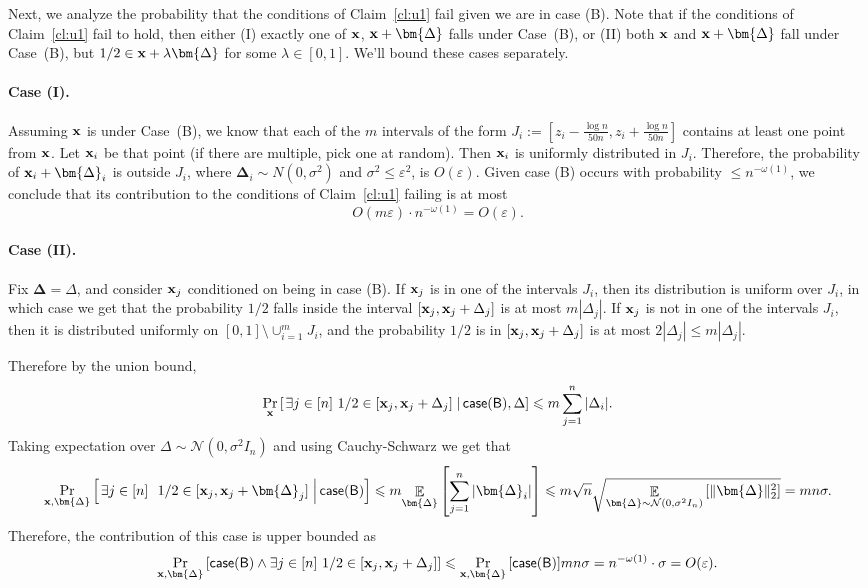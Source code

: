 \documentclass[10pt,a4paper]{article}
\newcommand\card[1]{\left| {#1} \right|}
\newcommand\Prob[2]{{\Pr_{#1}\left[ {#2} \right]}}
\newcommand\cProb[3]{{\Pr_{#1}\left[ \left. #3 \;\right\vert #2 \right]}}
\newcommand\Expect[2]{{\mathop{\mathbb{E}}_{#1}\left[ {#2} \right]}}
\newcommand\norm[1]{\| #1 \|}
\newcommand\eps{\varepsilon}
\renewcommand\leq{\leqslant}
\newcommand{\la}{\lambda}
\newcommand{\De}{\Delta}
\begin{document}
Next, we analyze the probability that the conditions of Claim~\ref{cl:u1} fail given we are in case (B).
Note that if the conditions of Claim~\ref{cl:u1} fail to hold, then either (I) exactly one of ${\bf x}$, ${\bf x}+\bm{\De}$ falls under Case~(B),
or (II) both ${\bf x}$ and ${\bf x}+\bm{\De}$ fall under Case~(B),  but $1/2\in {\bf x}+\la \bm{\De}$ for some $\la\in [0,1]$. We'll bound these cases separately.



\paragraph{Case (I).} Assuming ${\bf x}$ is under Case~(B), we know that each
of the $m$ intervals of the form $J_i := [z_i-\frac{\log n}{50n},z_i+\frac{\log n}{50n}]$ contains at least one point from ${\bf x}$.
Let ${\bf x}_i$ be that point (if there are multiple, pick one at random). Then ${\bf x}_i$ is uniformly distributed in $J_i$.
Therefore, the probability of ${\bf x}_i+\bm{\De}_i$ is outside $J_i$, where
$\bm{\De}_i \sim N(0,\sigma^2)$ and $\sigma^2\leq \eps^2$, is $O(\eps)$.
Given case (B) occurs with probability $\leq n^{-\omega(1)}$, we conclude that its contribution
to the conditions of Claim~\ref{cl:u1} failing is at most
\[
O(m \eps)\cdot n^{-\omega(1)} = O(\eps).
\]

\paragraph{Case (II).}
Fix $\bm{\De} = \De$, and consider ${\bf x}_j$ conditioned on being in case (B).
If ${\bf x}_j$ is in one of the intervals $J_i$, then its distribution is uniform over $J_i$, in which
case we get that the probability $1/2$ falls inside the interval $[{\bf x}_j,{\bf x}_j + \De_j]$ is at most
$m\card{\De_j}$. If ${\bf x}_j$ is not in one of the intervals $J_i$, then it is distributed uniformly
on $[0,1]\setminus\cup_{i=1}^{m} J_i$, and the probability $1/2$ is in $[{\bf x}_j,{\bf x}_j + \De_j]$ is
at most $2\card{\De_j}\leq m\card{\De_j}$.

Therefore by the union bound,
\[
\cProb{{\bf x}}{{\sf case (B)}, \De}{\exists j\in [n]~1/2\in [{\bf x}_j,{\bf x}_j+\De_j]}
\leq m\sum\limits_{j=1}^{n}{\card{\De_i}}.
\]
Taking expectation over $\De\sim\mathcal{N}(0,\sigma^2 I_n)$ and
using Cauchy-Schwarz we get that
\[
\cProb{{\bf x},\bm{\De}}{{\sf case (B)}}{\exists j\in [n]~~1/2\in [{\bf x}_j,{\bf x}_j+\bm{\De}_j]}
\leq m\Expect{\bm{\De}}{\sum\limits_{j=1}^{n}{\card{\bm{\De}_i}}}
\leq m\sqrt{n}\sqrt{\Expect{\bm{\De}\sim\mathcal{N}(0,\sigma^2 I_n)}{\norm{\bm{\De}}_2^2}}
= mn\sigma.
\]
Therefore, the contribution of this case is upper bounded as
\[
\Prob{{\bf x},\bm{\De}}{{\sf case (B)}\land \exists j\in [n]~1/2\in [{\bf x}_j,{\bf x}_j+\De_j]}
\leq \Prob{{\bf x},\bm{\De}}{{\sf case (B)}}mn\sigma
=n^{-\omega(1)}\cdot \sigma = O(\eps).
\]
\end{document}
